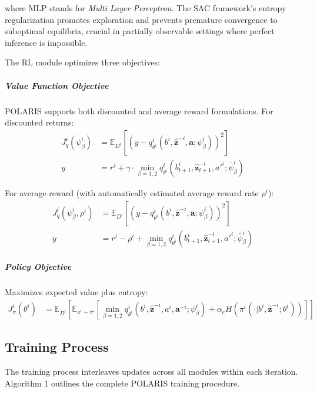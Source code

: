 where MLP stands for \emph{Multi Layer Perceptron}. The SAC framework's entropy regularization promotes exploration and prevents premature convergence to suboptimal equilibria, crucial in partially observable settings where perfect inference is impossible.

The RL module optimizes three objectives:

\subparagraph{Value Function Objective} POLARIS supports both discounted and average reward formulations. For discounted returns:
\begin{align}
    J^i_q(\psi^i_{\beta}) &= \mathbb{E}_{D^i}\left[(y - q^i_{\theta^i}(b^i, \boldsymbol{\hat{z}}^{-i}, \boldsymbol{a}; \psi^i_{\beta}))^2\right] \\
    y &= r^i + \gamma \cdot \min_{\beta=1,2} q^i_{\theta^i}(b^i_{t+1}, \boldsymbol{\hat{z}}^{-i}_{t+1}, a'^i; \bar{\psi}^i_{\beta})
\end{align}

For average reward (with automatically estimated average reward rate $\rho^i$):
\begin{align}
    J^i_q(\psi^i_{\beta}, \rho^i) &= \mathbb{E}_{D^i}\left[(y - q^i_{\theta^i}(b^i, \boldsymbol{\hat{z}}^{-i}, \boldsymbol{a}; \psi^i_{\beta}))^2\right] \\
    y &= r^i - \rho^i + \min_{\beta=1,2} q^i_{\theta^i}(b^i_{t+1}, \boldsymbol{\hat{z}}^{-i}_{t+1}, a'^i; \bar{\psi}^i_{\beta})
\end{align}

\subparagraph{Policy Objective} Maximizes expected value plus entropy:
\begin{align}
    J^i_{\pi}(\theta^i) &= \mathbb{E}_{D^i}\left[\mathbb{E}_{a^i \sim \pi^i}\left[\min_{\beta=1,2} q^i_{\theta^i}(b^i, \boldsymbol{\hat{z}}^{-i}, a^i, \boldsymbol{a}^{-i}; \psi^i_{\beta}) + \alpha_e H(\pi^i(\cdot|b^i, \boldsymbol{\hat{z}}^{-i}; \theta^i))\right]\right]
\end{align}

\subsection{Training Process}

The training process interleaves updates across all modules within each iteration. Algorithm 1 outlines the complete POLARIS training procedure.

